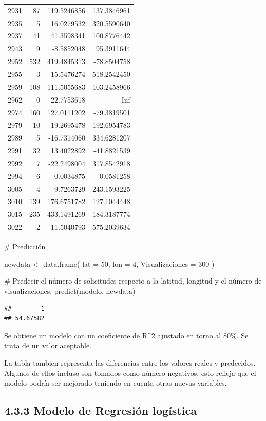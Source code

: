 \documentclass[
]{article}
\newenvironment{Shaded}{\begin{snugshade}}{\end{snugshade}}
\newcommand{\CommentTok}[1]{\textcolor[rgb]{0.50,0.62,0.50}{#1}}
\newcommand{\DataTypeTok}[1]{\textcolor[rgb]{0.87,0.87,0.75}{#1}}
\newcommand{\DecValTok}[1]{\textcolor[rgb]{0.86,0.86,0.80}{#1}}
\newcommand{\KeywordTok}[1]{\textcolor[rgb]{0.94,0.87,0.69}{#1}}
\newcommand{\NormalTok}[1]{\textcolor[rgb]{0.80,0.80,0.80}{#1}}
\newcommand{\StringTok}[1]{\textcolor[rgb]{0.80,0.58,0.58}{#1}}
\begin{document}
\begin{longtable}[]{@{}lrrr@{}}
2931 & 87 & 119.5246856 & 137.3846961\tabularnewline
2935 & 5 & 16.0279532 & 320.5590640\tabularnewline
2937 & 41 & 41.3598341 & 100.8776442\tabularnewline
2943 & 9 & -8.5852048 & 95.3911644\tabularnewline
2952 & 532 & 419.4845313 & -78.8504758\tabularnewline
2955 & 3 & -15.5476274 & 518.2542450\tabularnewline
2959 & 108 & 111.5055683 & 103.2458966\tabularnewline
2962 & 0 & -22.7753618 & Inf\tabularnewline
2974 & 160 & 127.0111202 & -79.3819501\tabularnewline
2979 & 10 & 19.2695478 & 192.6954783\tabularnewline
2989 & 5 & -16.7314060 & 334.6281207\tabularnewline
2991 & 32 & 13.4022892 & -41.8821539\tabularnewline
2992 & 7 & -22.2498004 & 317.8542918\tabularnewline
2994 & 6 & -0.0034875 & 0.0581258\tabularnewline
3005 & 4 & -9.7263729 & 243.1593225\tabularnewline
3010 & 139 & 176.6751782 & 127.1044448\tabularnewline
3015 & 235 & 433.1491269 & 184.3187774\tabularnewline
3022 & 2 & -11.5040793 & 575.2039634\tabularnewline
\bottomrule
\end{longtable}

\begin{Shaded}
\begin{Highlighting}[]
\CommentTok{\# Predicción}

\NormalTok{newdata \textless{}{-}}\StringTok{ }\KeywordTok{data.frame}\NormalTok{(}
  \DataTypeTok{lat =} \DecValTok{50}\NormalTok{,}
  \DataTypeTok{lon =} \DecValTok{4}\NormalTok{,}
  \DataTypeTok{Visualizaciones =} \DecValTok{300}
\NormalTok{)}

\CommentTok{\# Predecir el número de solicitudes respecto a la latitud, longitud y el número de visualizaciones.}
\KeywordTok{predict}\NormalTok{(modelo, newdata)}
\end{Highlighting}
\end{Shaded}

\begin{verbatim}
##        1 
## 54.67582
\end{verbatim}

Se obtiene un modelo con un coeficiente de R\^{}2 ajustado en torno al
80\%. Se trata de un valor aceptable.

La tabla tambien representa las diferencias entre los valores reales y
predecidos. Algunos de ellos incluso son tomados como número negativos,
esto refleja que el modelo podría ser mejorado teniendo en cuenta otras
nuevas variables.

\hypertarget{modelo-de-regresiuxf3n-loguxedstica}{%
\subsection{4.3.3 Modelo de Regresión
logística}\label{modelo-de-regresiuxf3n-loguxedstica}}
\end{document}
